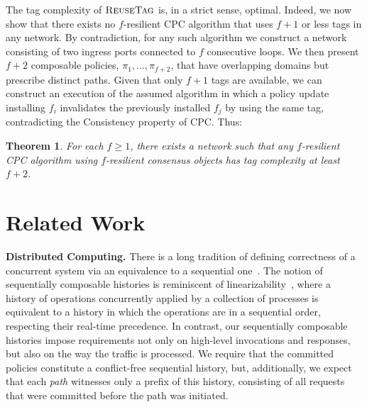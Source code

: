 \documentclass[11pt,pdftex,letter]{article}
\newcommand{\DPO}{\textsc{ReuseTag}}
\newcommand{\eg}{{\it e.g.}}
\newtheorem{theorem}{Theorem}
\begin{document}
The tag complexity of $\DPO$ is, in a strict sense, optimal.
Indeed, we now show that there exists no $f$-resilient CPC algorithm that uses
$f+1$ or less tags in any network.
By contradiction, for any such algorithm we construct a
network consisting of two ingress ports connected to $f$ consecutive
loops.
We then present $f+2$ composable policies, $\pi_1,\ldots,\pi_{f+2}$,
that have overlapping domains but prescribe distinct paths.
Given that only $f+1$ tags are available, we can construct an
execution of the assumed algorithm in which a policy update installing
$f_i$ invalidates the previously installed $f_j$ by using the same
tag, contradicting the Consistency property of CPC.
Thus:

\begin{theorem}\label{th:tagbound}
For each $f\geq 1$, there exists a network such that
any $f$-resilient CPC algorithm using %
$f$-resilient consensus objects
has tag complexity at least $f+2$.
\end{theorem}



\section{Related Work}\label{sec:related}

%
%




\noindent\textbf{Distributed Computing.}
There is a long tradition of defining correctness of a concurrent system via
an equivalence to a sequential one~\cite{Pap79-serial,Lam79,HW90}.  The notion
of sequentially composable histories is reminiscent of
linearizability~\cite{HW90}, where a history of operations concurrently
applied by a collection of processes is equivalent to a history in which the
operations are in a sequential order, respecting their real-time precedence.
In contrast, our sequentially composable histories impose requirements not
only on high-level invocations and responses, but also on the way the traffic
is processed. We require that the committed policies constitute a
conflict-free sequential history, but, additionally,  we expect that each
\emph{path} witnesses only a prefix of this history, consisting of all
requests that were committed before the path was initiated.
\end{document}
